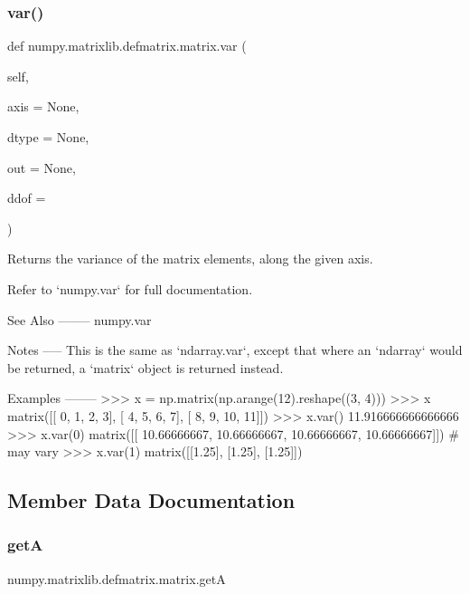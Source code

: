 \subsubsection{\texorpdfstring{var()}{var()}}
{\footnotesize\ttfamily def numpy.\+matrixlib.\+defmatrix.\+matrix.\+var (\begin{DoxyParamCaption}\item[{}]{self,  }\item[{}]{axis = {\ttfamily None},  }\item[{}]{dtype = {\ttfamily None},  }\item[{}]{out = {\ttfamily None},  }\item[{}]{ddof = {} }\end{DoxyParamCaption})}

\begin{DoxyVerb}Returns the variance of the matrix elements, along the given axis.

Refer to `numpy.var` for full documentation.

See Also
--------
numpy.var

Notes
-----
This is the same as `ndarray.var`, except that where an `ndarray` would
be returned, a `matrix` object is returned instead.

Examples
--------
>>> x = np.matrix(np.arange(12).reshape((3, 4)))
>>> x
matrix([[ 0,  1,  2,  3],
[ 4,  5,  6,  7],
[ 8,  9, 10, 11]])
>>> x.var()
11.916666666666666
>>> x.var(0)
matrix([[ 10.66666667,  10.66666667,  10.66666667,  10.66666667]]) # may vary
>>> x.var(1)
matrix([[1.25],
[1.25],
[1.25]])\end{DoxyVerb}
 

\subsection{Member Data Documentation}
\mbox{\label{classnumpy_1_1matrixlib_1_1defmatrix_1_1matrix_af64a2a07a207cba914b03d1bc13d27ec}} 
\subsubsection{\texorpdfstring{getA}{getA}}
{\footnotesize\ttfamily numpy.\+matrixlib.\+defmatrix.\+matrix.\+getA\hspace{0.3cm}{\ttfamily [static]}}


